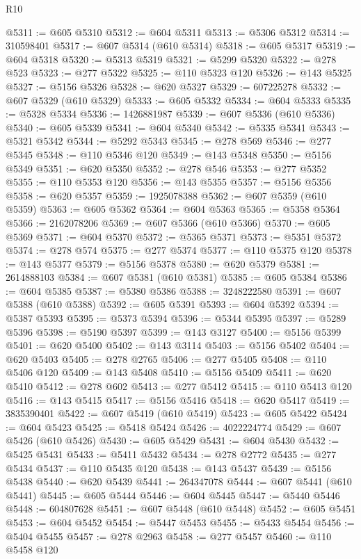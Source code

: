 \begin{lexlean}{R10}
\begin{coremodule}
@5311 := @605 @5310
@5312 := @604 @5311
@5313 := @5306 @5312
@5314 := 310598401
@5317 := @607 @5314 (@610 @5314)
@5318 := @605 @5317
@5319 := @604 @5318
@5320 := @5313 @5319
@5321 := @5299 @5320
@5322 := @278 @523
@5323 := @277 @5322
@5325 := @110 @5323 @120
@5326 := @143 @5325
@5327 := @5156 @5326
@5328 := @620 @5327
@5329 := 607225278
@5332 := @607 @5329 (@610 @5329)
@5333 := @605 @5332
@5334 := @604 @5333
@5335 := @5328 @5334
@5336 := 1426881987
@5339 := @607 @5336 (@610 @5336)
@5340 := @605 @5339
@5341 := @604 @5340
@5342 := @5335 @5341
@5343 := @5321 @5342
@5344 := @5292 @5343
@5345 := @278 @569
@5346 := @277 @5345
@5348 := @110 @5346 @120
@5349 := @143 @5348
@5350 := @5156 @5349
@5351 := @620 @5350
@5352 := @278 @546
@5353 := @277 @5352
@5355 := @110 @5353 @120
@5356 := @143 @5355
@5357 := @5156 @5356
@5358 := @620 @5357
@5359 := 1925078388
@5362 := @607 @5359 (@610 @5359)
@5363 := @605 @5362
@5364 := @604 @5363
@5365 := @5358 @5364
@5366 := 2162078206
@5369 := @607 @5366 (@610 @5366)
@5370 := @605 @5369
@5371 := @604 @5370
@5372 := @5365 @5371
@5373 := @5351 @5372
@5374 := @278 @574
@5375 := @277 @5374
@5377 := @110 @5375 @120
@5378 := @143 @5377
@5379 := @5156 @5378
@5380 := @620 @5379
@5381 := 2614888103
@5384 := @607 @5381 (@610 @5381)
@5385 := @605 @5384
@5386 := @604 @5385
@5387 := @5380 @5386
@5388 := 3248222580
@5391 := @607 @5388 (@610 @5388)
@5392 := @605 @5391
@5393 := @604 @5392
@5394 := @5387 @5393
@5395 := @5373 @5394
@5396 := @5344 @5395
@5397 := @5289 @5396
@5398 := @5190 @5397
@5399 := @143 @3127
@5400 := @5156 @5399
@5401 := @620 @5400
@5402 := @143 @3114
@5403 := @5156 @5402
@5404 := @620 @5403
@5405 := @278 @2765
@5406 := @277 @5405
@5408 := @110 @5406 @120
@5409 := @143 @5408
@5410 := @5156 @5409
@5411 := @620 @5410
@5412 := @278 @602
@5413 := @277 @5412
@5415 := @110 @5413 @120
@5416 := @143 @5415
@5417 := @5156 @5416
@5418 := @620 @5417
@5419 := 3835390401
@5422 := @607 @5419 (@610 @5419)
@5423 := @605 @5422
@5424 := @604 @5423
@5425 := @5418 @5424
@5426 := 4022224774
@5429 := @607 @5426 (@610 @5426)
@5430 := @605 @5429
@5431 := @604 @5430
@5432 := @5425 @5431
@5433 := @5411 @5432
@5434 := @278 @2772
@5435 := @277 @5434
@5437 := @110 @5435 @120
@5438 := @143 @5437
@5439 := @5156 @5438
@5440 := @620 @5439
@5441 := 264347078
@5444 := @607 @5441 (@610 @5441)
@5445 := @605 @5444
@5446 := @604 @5445
@5447 := @5440 @5446
@5448 := 604807628
@5451 := @607 @5448 (@610 @5448)
@5452 := @605 @5451
@5453 := @604 @5452
@5454 := @5447 @5453
@5455 := @5433 @5454
@5456 := @5404 @5455
@5457 := @278 @2963
@5458 := @277 @5457
@5460 := @110 @5458 @120

\end{coremodule}
\end{lexlean}

